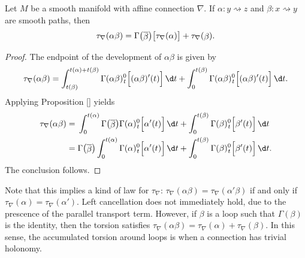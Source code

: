 \begin{proposition}
  Let $M$ be a smooth manifold with affine connection $\nabla$. If $\alpha \colon y \rightsquigarrow z$ and $\beta \colon x \rightsquigarrow y$ are smooth paths, then
  \begin{equation}
    \tau_\nabla (\alpha \beta) = \Gamma\big(\raisebox{-1pt}{$\overline{\beta}$}\big) \big[ \tau_\nabla (\alpha) \big] + \tau_\nabla(\raisebox{-1pt}{$\beta$}). 
  \end{equation}
\end{proposition}
\begin{proof}
  The endpoint of the development of $\alpha \beta$ is given by
  \begin{equation}
    \tau_\nabla(\alpha\beta) = \int_{t(\beta)}^{t(\alpha) + t(\beta)} \Gamma(\alpha \beta)_{\hspace{0.5pt}t}^0 \Big[ (\alpha \beta)'(t)\Big] \, \d t  + \int_{0}^{t(\beta)} \Gamma(\alpha \beta)_{\hspace{0.5pt}t}^0 \Big[ (\alpha \beta)'(t)\Big] \, \d t.
  \end{equation}
  Applying Proposition \ref{} yields
  \begin{align}
    \tau_\nabla(\alpha\beta) &= \,\int_{0}^{t(\alpha)} \Gamma\big(\raisebox{-1pt}{$\overline{\beta}$}\big)\Gamma(\alpha)_{\hspace{0.5pt}t}^0 \Big[ \alpha'(t)\Big] \, \d t + \int_{0}^{t(\beta)} \Gamma(\beta)_{\hspace{0.5pt}t}^0 \Big[ \beta'(t)\Big] \, \d t \\
    &= \Gamma\big(\raisebox{-1pt}{$\overline{\beta}$}\big) \int_{0}^{t(\alpha)} \Gamma(\alpha)_{\hspace{0.5pt}t}^0 \Big[ \alpha'(t)\Big] \, \d t + \int_{0}^{t(\beta)} \Gamma(\beta)_{\hspace{0.5pt}t}^0 \Big[ \beta'(t)\Big] \, \d t.
  \end{align}
  The conclusion follows.
\end{proof}

Note that this implies a kind of  law for $\tau_\nabla$: $\tau_\nabla(\alpha \beta) = \tau_\nabla(\alpha' \beta)$ if and only if $\tau_\nabla(\alpha) = \tau_\nabla(\alpha')$. Left cancellation does not immediately hold, due to the prescence of the parallel transport term. However, if $\beta$ is a loop such that $\Gamma(\beta)$ is the identity, then the torsion satisfies $\tau_\nabla(\alpha\beta) = \tau_\nabla(\alpha) + \tau_\nabla(\beta)$. In this sense, the accumulated torsion around loops is  when a connection has trivial holonomy.

